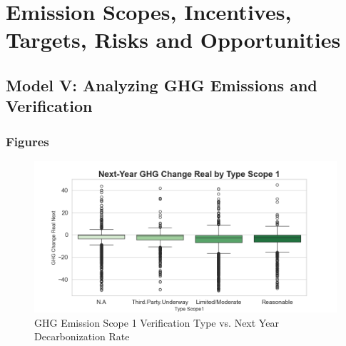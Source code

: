 \section{Emission Scopes, Incentives, Targets, Risks and Opportunities}
\subsection{Model V: Analyzing GHG Emissions and Verification}





\subsubsection{Figures}
\begin{figure}[H]
\centering
  \includegraphics[width=\textwidth]{figures/ghg_change_real_next_by_type_scope1.png}
\caption{GHG Emission Scope 1 Verification Type vs. Next Year Decarbonization Rate}
\label{fig:ghg_change_real_next_by_ghg_type}
\end{figure}

